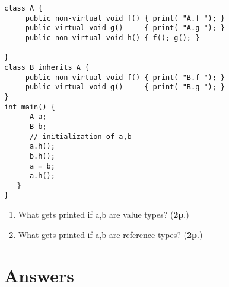 \documentclass{article}
\begin{document}
\begin{enumerate}
{\small 
\begin{verbatim}
class A {
     public non-virtual void f() { print( "A.f "); }
     public virtual void g()     { print( "A.g "); }
     public non-virtual void h() { f(); g(); }
    
}
class B inherits A {
     public non-virtual void f() { print( "B.f "); }
     public virtual void g()     { print( "B.g "); }
}
int main() {
      A a;
      B b;
      // initialization of a,b
      a.h();
      b.h();
      a = b;
      a.h(); 
   }
}
\end{verbatim}
}
\begin{enumerate}
\item What gets printed if a,b are value types?  (\textbf{2p}.)
\item What gets printed if a,b are reference types?  (\textbf{2p}.)
\end{enumerate}
\end{enumerate}

\newpage
\section*{Answers}
\end{document}
